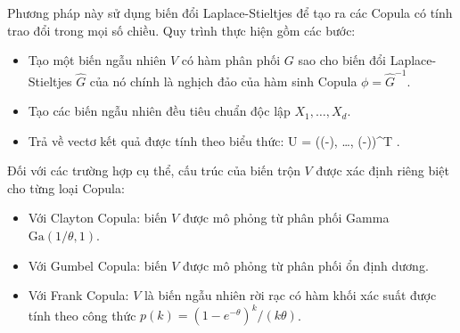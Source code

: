 Phương pháp này sử dụng biến đổi Laplace-Stieltjes để tạo ra các Copula có tính trao đổi trong mọi số chiều. Quy trình thực hiện gồm các bước:
\begin{itemize}
    \item Tạo một biến ngẫu nhiên $V$ có hàm phân phối $G$ sao cho biến đổi Laplace-Stieltjes $\hat{G}$ của nó chính là nghịch đảo của hàm sinh Copula $\phi = \hat{G}^{-1}$.
    \item Tạo các biến ngẫu nhiên đều tiêu chuẩn độc lập $X_1, \dots, X_d$.
    \item Trả về vectơ kết quả được tính theo biểu thức:
    \bea
     U = \left(\left(-\right), \dots, \left(-\right)\right)^T . 
    \eea
\end{itemize}

Đối với các trường hợp cụ thể, cấu trúc của biến trộn $V$ được xác định riêng biệt cho từng loại Copula:
\begin{itemize}
    \item Với Clayton Copula: biến $V$ được mô phỏng từ phân phối Gamma $\text{Ga}(1/\theta, 1)$.
    \item Với Gumbel Copula: biến $V$ được mô phỏng từ phân phối ổn định dương.
    \item Với Frank Copula: $V$ là biến ngẫu nhiên rời rạc có hàm khối xác suất được tính theo công thức $p(k) = (1 - e^{-\theta})^k / (k\theta)$.
\end{itemize}
\cite{hofert2008sampling}